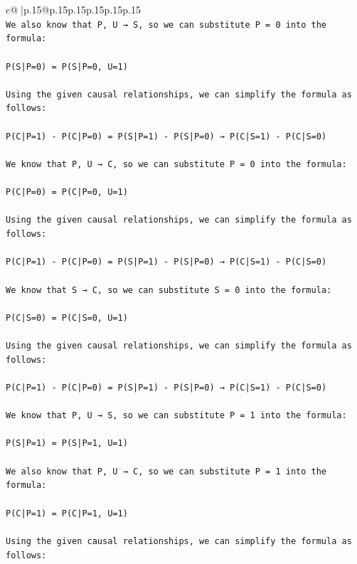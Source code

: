 \documentclass{article}
\begin{document}
{\begin{supertabular}{c@{$\;$}|p{.15\linewidth}@{}p{.15\linewidth}p{.15\linewidth}p{.15\linewidth}p{.15\linewidth}p{.15\linewidth}}
{{{\\ 
\texttt{We also know that P, U → S, so we can substitute P = 0 into the formula:} \\
\\ 
\texttt{P(S|P=0) = P(S|P=0, U=1)} \\
\\ 
\texttt{Using the given causal relationships, we can simplify the formula as follows:} \\
\\ 
\texttt{P(C|P=1) {-} P(C|P=0) = P(S|P=1) {-} P(S|P=0) → P(C|S=1) {-} P(C|S=0)} \\
\\ 
\texttt{We know that P, U → C, so we can substitute P = 0 into the formula:} \\
\\ 
\texttt{P(C|P=0) = P(C|P=0, U=1)} \\
\\ 
\texttt{Using the given causal relationships, we can simplify the formula as follows:} \\
\\ 
\texttt{P(C|P=1) {-} P(C|P=0) = P(S|P=1) {-} P(S|P=0) → P(C|S=1) {-} P(C|S=0)} \\
\\ 
\texttt{We know that S → C, so we can substitute S = 0 into the formula:} \\
\\ 
\texttt{P(C|S=0) = P(C|S=0, U=1)} \\
\\ 
\texttt{Using the given causal relationships, we can simplify the formula as follows:} \\
\\ 
\texttt{P(C|P=1) {-} P(C|P=0) = P(S|P=1) {-} P(S|P=0) → P(C|S=1) {-} P(C|S=0)} \\
\\ 
\texttt{We know that P, U → S, so we can substitute P = 1 into the formula:} \\
\\ 
\texttt{P(S|P=1) = P(S|P=1, U=1)} \\
\\ 
\texttt{We also know that P, U → C, so we can substitute P = 1 into the formula:} \\
\\ 
\texttt{P(C|P=1) = P(C|P=1, U=1)} \\
\\ 
\texttt{Using the given causal relationships, we can simplify the formula as follows:} \\
}}}
\end{supertabular}}
\end{document}
